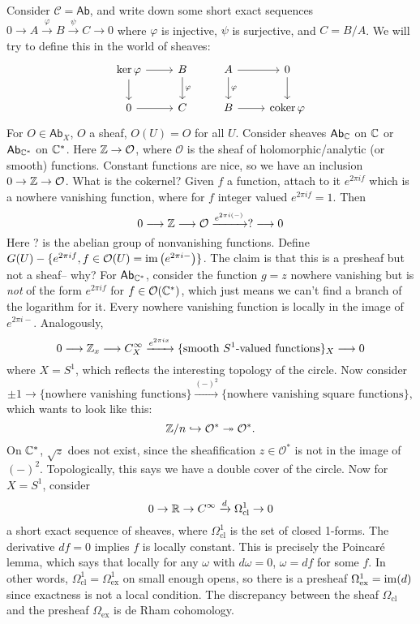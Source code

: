 \begin{example}
    Consider $\mathcal{C} =\mathsf{Ab} $, and write down some short exact sequences $0 \to A \xrightarrow{\varphi }  B \xrightarrow{\psi}  C \to 0$ where $\varphi $ is injective, $\psi$ is surjective, and $C = B / A$. We will try to define this in the world of sheaves: \[
    \begin{tikzcd}
\ker\varphi \arrow[r] \arrow[d] & B \arrow[d, "\varphi"] & A \arrow[d, "\varphi"] \arrow[r] & 0 \arrow[d]                 \\
0 \arrow[r]                     & C                      & B \arrow[r]                      & \operatorname{coker}\varphi
\end{tikzcd}
    \] For $O \in \mathsf{Ab} _X$, $O$ a sheaf, $O(U)=O$ for all $U$. Consider sheaves $\mathsf{Ab}_{\mathbb{C}}$ on $\mathbb{C}$ or $\mathsf{Ab} _{\mathbb{C}^*}$ on $\mathbb{C}^*$. Here $\mathbb{Z} \to \mathcal{O} $, where $\mathcal{O} $ is the sheaf of holomorphic/analytic (or smooth) functions. Constant functions are nice, so we have an inclusion $0 \to \mathbb{Z} \to \mathcal{O} $. What is the cokernel? Given $f$ a function, attach to it $e ^{ 2 \pi i f}$ which is a nowhere vanishing function, where for $f$ integer valued $e^{2\pi i f}=1$. Then \[
    0 \longrightarrow \mathbb{Z} \longrightarrow \mathcal{O} \xrightarrow{e ^{2\pi i (-)}} ? \longrightarrow 0
\]Here ? is the abelian group of nonvanishing functions. Define $G(U) - \{ e^{2 \pi  i f }, f \in \mathcal{O} (U) = \operatorname{im} \left( e^{2\pi i -} \right) \} $. The claim is that this is a presheaf but not a sheaf-- why? For $\mathsf{Ab} _{\mathbb{C}^*}$, consider the function $g=z$ nowhere vanishing but is \emph{not} of the form $e^{2\pi i f}$ for $f \in \mathcal{O} (\mathbb{C}^*)$, which just means we can't find a branch of the logarithm for it. Every nowhere vanishing function is locally in the image of $e^{2\pi i -}$. Analogously, \[
0 \longrightarrow \mathbb{Z}_x \longrightarrow C^{\infty}_X \xrightarrow{e ^{2\pi ix}} \{\text{smooth} \ S^1\text{-valued functions} \} _X \longrightarrow 0
\] where $X=S^1 $,  which reflects the  interesting topology of the circle.
Now consider \[
    \pm 1 \longrightarrow \{ \text{nowhere vanishing functions} \} \xrightarrow{(-)^2} \{\text{nowhere vanishing square functions} \} ,
\] which wants to look like this: \[
\mathbb{Z} / n \hookrightarrow \mathcal{O} ^*  \twoheadrightarrow \mathcal{O} ^*.
\] On $\mathbb{C}^*$, $\sqrt{z} $ does not exist, since the sheafification $z \in \mathcal{O} ^*$ is not in the image of $(-)^2$. Topologically, this says we have a double cover of the circle.
Now for $X=S^1 $, consider \[
0 \to \mathbb{R} \to C^{\infty}\xrightarrow{d} \Omega _{\mathrm{cl}}^1 \to 0
\] a short exact sequence of sheaves, where $\Omega_{\mathrm{cl}}^1$ is the set of closed 1-forms. The derivative $df =0$ implies $f$ is locally constant. This is precisely the Poincar\'e lemma, which says that locally for any $\omega$ with $d\omega =0$, $\omega=df$ for some $f$. In other words, $\Omega_{\mathrm{cl}}^1= \Omega_{\mathrm{ex}}^1$ on small enough opens, so there is a presheaf $\Omega_{\mathrm{ex}}^1 = \operatorname{im} (d)$ since exactness is not a local condition. The discrepancy between the sheaf $\Omega_{\mathrm{cl}}$ and the presheaf $\Omega_{\mathrm{ex}}$ is de Rham cohomology. 
\end{example}
